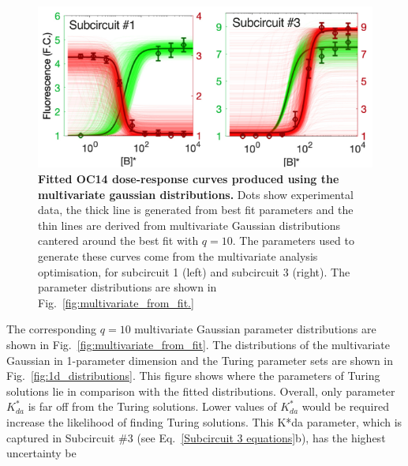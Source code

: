 \begin{figure}[H] %
    \centering
        \includegraphics[width=1\textwidth]{chapters/Chapter 2/dose_response_multivariate_gaussian} %
    \caption{\textbf{Fitted OC14 dose-response curves
    produced using the multivariate gaussian distributions.}
    Dots show experimental data,
        the thick line is generated from best fit parameters and the thin lines are derived from multivariate Gaussian distributions cantered around the best fit with $q=10$.
        The parameters used to generate these curves come from the multivariate analysis optimisation, for subcircuit 1 (left) and subcircuit 3 (right). The parameter distributions are shown in Fig.~\ref{fig:multivariate_from_fit.}}
    \label{fig:dose_response_multivariate_gaussian} %
\end{figure}
The corresponding $q=10$ multivariate Gaussian parameter distributions are shown in Fig.~\ref{fig:multivariate_from_fit}.
The distributions of the multivariate Gaussian in 1-parameter dimension and the Turing parameter sets are shown in Fig.~\ref{fig:1d_distributions}.
This figure shows where the parameters of Turing solutions lie in comparison with the fitted distributions.
Overall, only parameter $K^*_{da}$ is far off from the Turing solutions.
Lower values of $K^*_{da}$ would be required increase the likelihood of finding Turing solutions.
This K*da parameter, which is captured in Subcircuit \#3 (see Eq.~\ref{Subcircuit 3 equations}b), has the highest uncertainty be

